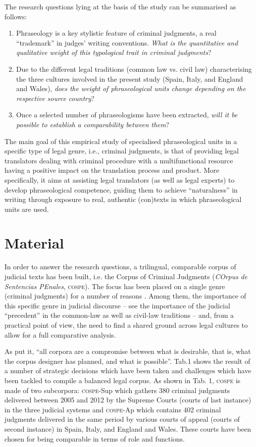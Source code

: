 \documentclass[output=paper]{LSP/langsci}
\begin{document}
The research questions lying at the basis of the study can be summarised as follows:

\begin{enumerate}
\item Phraseology is a key stylistic feature of criminal judgments, a real “trademark” in judges’ writing conventions. \textit{What is the quantitative and qualitative weight of this typological trait in criminal judgments}? 
\item Due to the different legal traditions (common law vs. civil law) characterising the three cultures involved in the present study (Spain, Italy, and England and Wales), \textit{does the weight of phraseological units change depending on the respective source country}? 
\item Once a selected number of phraseologisms have been extracted, \textit{will it be possible to establish a comparability between them}?
\end{enumerate}

The main goal of this empirical study of specialised phraseological units in a specific type of legal genre, i.e., criminal judgments, is that of providing legal translators dealing with criminal procedure with a multifunctional resource having a positive impact on the translation process and product. More specifically, it aims at assisting legal translators (as well as legal experts) to develop phraseological competence, guiding them to achieve “naturalness” in writing through exposure to real, authentic (con)texts in which phraseological units are used.

\section{Material}
In order to answer the research questions, a trilingual, comparable corpus of judicial texts has been built, i.e. the Corpus of Criminal Judgments (\textit{COrpus de Sentencias PEnales}, \textsc{cospe}). The focus has been placed on a single genre (criminal judgments) for a number of reasons \citep[see][171-181]{Pontrandolfo2013a}. Among them, the importance of this specific genre in judicial discourse – see the importance of the judicial “precedent” in the common-law as well as civil-law traditions – and, from a practical point of view, the need to find a shared ground across legal cultures to allow for a full comparative analysis.

As \citet[156-157]{Hunston2008} put it, “all corpora are a compromise between what is desirable, that is, what the corpus designer has planned, and what is possible”. Tab.1 shows the result of a number of strategic decisions which have been taken and challenges which have been tackled to compile a balanced legal corpus. As shown in Tab. 1, \textsc{cospe} is made of two subcorpora: \textsc{cospe}-Sup which gathers 380 criminal judgments delivered between 2005 and 2012 by the Supreme Courts (courts of last instance) in the three judicial systems and \textsc{cospe}-Ap which contains 402 criminal judgments delivered in the same period by various courts of appeal (courts of second instance) in Spain, Italy, and England and Wales. These courts have been chosen for being comparable in terms of role and functions.
\end{document}
